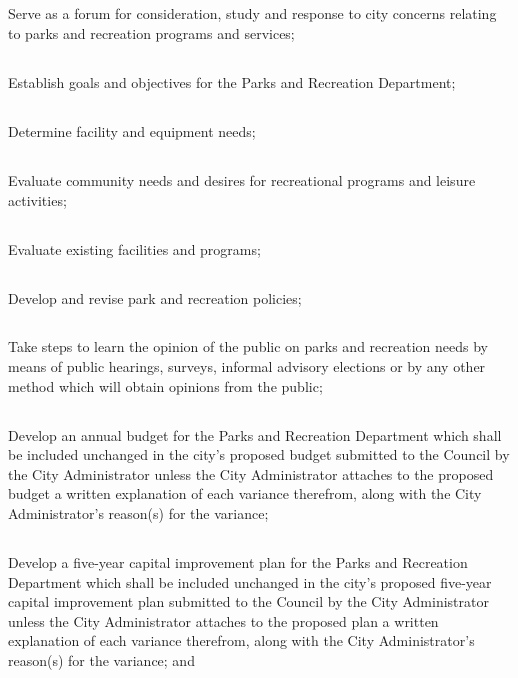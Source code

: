 \subsection{}
Serve as a forum for consideration, study and response to city concerns relating to parks and recreation programs and services;
\subsection{}
Establish goals and objectives for the Parks and Recreation Department;
\subsection{}
Determine facility and equipment needs;
\subsection{}
Evaluate community needs and desires for recreational programs and leisure activities;
\subsection{}
Evaluate existing facilities and programs;
\subsection{}
Develop and revise park and recreation policies;
\subsection{}
Take steps to learn the opinion of the public on parks and recreation needs by means of public hearings, surveys, informal advisory elections or by any other method which will obtain opinions from the public;
\subsection{}
Develop an annual budget for the Parks and Recreation Department which shall be included unchanged in the city’s proposed budget submitted to the Council by the City Administrator unless the City Administrator attaches to the proposed budget a written explanation of each variance therefrom, along with the City Administrator’s reason(s) for the variance;
\subsection{}
Develop a five-year capital improvement plan for the Parks and Recreation Department which shall be included unchanged in the city’s proposed five-year capital improvement plan submitted to the Council by the City Administrator unless the City Administrator attaches to the proposed plan a written explanation of each variance therefrom, along with the City Administrator’s reason(s) for the variance; and
